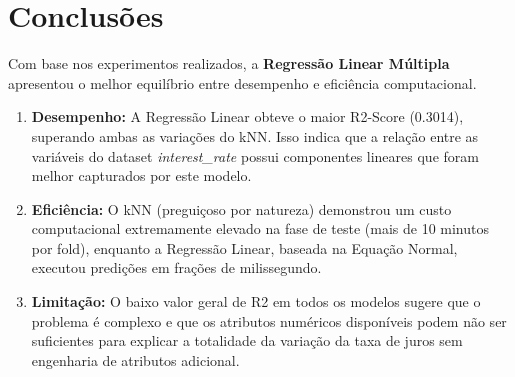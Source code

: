 \documentclass[12pt,a4paper]{article}
\begin{document}
\section{Conclusões}
Com base nos experimentos realizados, a \textbf{Regressão Linear Múltipla} apresentou o melhor equilíbrio entre desempenho e eficiência computacional.

\begin{enumerate}
    \item \textbf{Desempenho:} A Regressão Linear obteve o maior R2-Score (0.3014), superando ambas as variações do kNN. Isso indica que a relação entre as variáveis do dataset \textit{interest\_rate} possui componentes lineares que foram melhor capturados por este modelo.
    \item \textbf{Eficiência:} O kNN (preguiçoso por natureza) demonstrou um custo computacional extremamente elevado na fase de teste (mais de 10 minutos por fold), enquanto a Regressão Linear, baseada na Equação Normal, executou predições em frações de milissegundo.
    \item \textbf{Limitação:} O baixo valor geral de R2 em todos os modelos sugere que o problema é complexo e que os atributos numéricos disponíveis podem não ser suficientes para explicar a totalidade da variação da taxa de juros sem engenharia de atributos adicional.
\end{enumerate}
\end{document}
